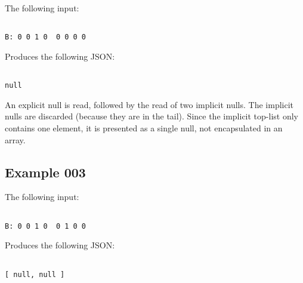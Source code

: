 The following input:

\begin{changemargin}{-60mm}{0mm}
\begin{myquote}
\begin{verbatim}

B: 0 0 1 0  0 0 0 0

\end{verbatim}
\end{myquote}
\end{changemargin}

Produces the following JSON:

\begin{changemargin}{-60mm}{0mm}
\begin{myquote}
\begin{verbatim}

null

\end{verbatim}
\end{myquote}
\end{changemargin}

An explicit null is read, followed by the read of two implicit nulls.
The implicit nulls are discarded (because they are in the tail).
Since the implicit top-list only contains one element, it is presented
as a single null, not encapsulated in an array.

\subsection{Example 003}

The following input:

\begin{changemargin}{-60mm}{0mm}
\begin{myquote}
\begin{verbatim}

B: 0 0 1 0  0 1 0 0

\end{verbatim}
\end{myquote}
\end{changemargin}

Produces the following JSON:

\begin{changemargin}{-60mm}{0mm}
\begin{myquote}
\begin{verbatim}

[ null, null ]

\end{verbatim}
\end{myquote}
\end{changemargin}

